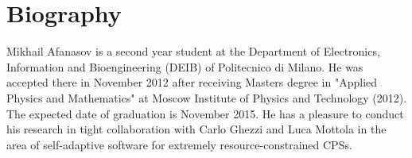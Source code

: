 \section{Biography}

Mikhail Afanasov is a second year student at the Department of Electronics,
Information and Bioengineering (DEIB) of Politecnico di Milano. He was accepted
there in November 2012 after receiving Masters degree in "Applied Physics and
Mathematics" at Moscow Institute of Physics and Technology (2012). The expected
date of graduation is November 2015. He has a pleasure to conduct his research
in tight collaboration with Carlo Ghezzi and Luca Mottola in the area of
self-adaptive software for extremely resource-constrained CPSs.
